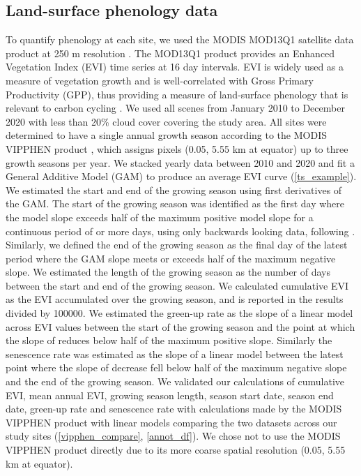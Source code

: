 \documentclass[11pt,a4paper]{article}
\begin{document}
\subsection{Land-surface phenology data}

To quantify phenology at each site, we used the MODIS MOD13Q1 satellite data product at 250 m resolution \citep{MOD13Q1}. The MOD13Q1 product provides an Enhanced Vegetation Index (EVI) time series at 16 day intervals. EVI is widely used as a measure of vegetation growth and is well-correlated with Gross Primary Productivity (GPP), thus providing a measure of land-surface phenology that is relevant to carbon cycling \citep{Sjostrom2011}. We used all scenes from January 2010 to December 2020 with less than 20\% cloud cover covering the study area. All sites were determined to have a single annual growth season according to the MODIS VIPPHEN product \citep{VIPPHEN}, which assigns pixels (0.05\textdegree, 5.55 km at equator) up to three growth seasons per year. We stacked yearly data between 2010 and 2020 and fit a General Additive Model (GAM) to produce an average EVI curve (\autoref{ts_example}). We estimated the start and end of the growing season using first derivatives of the GAM. The start of the growing season was identified as the first day where the model slope exceeds half of the maximum positive model slope for a continuous period of \modisWin{} or more days, using only backwards looking data, following \citet{White2009}. Similarly, we defined the end of the growing season as the final day of the latest \trmmWin{} period where the GAM slope meets or exceeds half of the maximum negative slope. We estimated the length of the growing season as the number of days between the start and end of the growing season. We calculated cumulative EVI as the EVI accumulated over the growing season, and is reported in the results divided by 100000. We estimated the green-up rate as the slope of a linear model across EVI values between the start of the growing season and the point at which the slope of reduces below half of the maximum positive slope. Similarly the senescence rate was estimated as the slope of a linear model between the latest point where the slope of decrease fell below half of the maximum negative slope and the end of the growing season. We validated our calculations of cumulative EVI, mean annual EVI, growing season length, season start date, season end date, green-up rate and senescence rate with calculations made by the MODIS VIPPHEN product with linear models comparing the two datasets across our study sites (\autoref{vipphen_compare}, \autoref{annot_df}). We chose not to use the MODIS VIPPHEN product directly due to its more coarse spatial resolution (0.05\textdegree, 5.55 km at equator).
\end{document}
